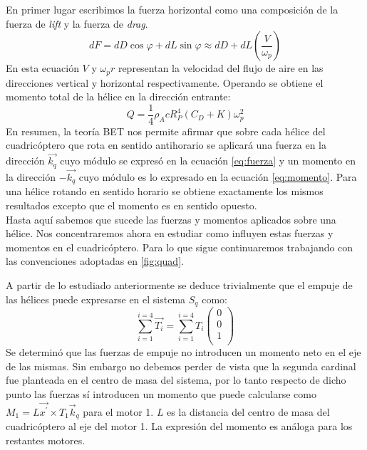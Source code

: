 \documentclass[main]{subfiles}
\begin{document}
En primer lugar escribimos la fuerza horizontal como una composici\'on de la fuerza de \emph{lift} y la fuerza de \emph{drag}. 
\begin{equation}
dF=dD\cos\varphi+dL\sin\varphi \approx dD +dL\left(\frac{V}{\omega_p}\right)
\end{equation} 
En esta ecuaci\'on $V$ y $\omega_p r$ representan la velocidad del flujo de aire en las direcciones vertical y horizontal respectivamente. Operando se obtiene el momento total de la h\'elice en la direcci\'on entrante:
\begin{equation}
\label{eq:momento}
Q=\frac{1}{4}\rho_A c R_P^4(C_D+K)\omega_p^2
\end{equation}
En resumen, la teor\'ia BET nos permite afirmar que sobre cada h\'elice del cuadric\'optero que rota en sentido antihorario se aplicar\'a una fuerza en la direcci\'on $\vec{k_q}$ cuyo m\'odulo se expres\'o en la ecuaci\'on \ref{eq:fuerza} y un momento en la direcci\'on $-\vec{k_q}$ cuyo m\'odulo es lo expresado en la ecuaci\'on \ref{eq:momento}. Para una h\'elice rotando en sentido horario se obtiene exactamente los mismos resultados excepto que el momento es en sentido opuesto.\\

Hasta aqu\'i sabemos que sucede las fuerzas y momentos aplicados sobre una h\'elice. Nos concentraremos ahora en estudiar como influyen estas fuerzas y momentos en el cuadric\'optero. Para lo que sigue continuaremos trabajando con las convenciones adoptadas en \ref{fig:quad}. 
 
A partir de lo estudiado anteriormente se deduce trivialmente que el empuje de las h\'elices puede expresarse en el sistema $S_q$ como:
\begin{equation}
\sum_{i=1}^{i=4} \vec{T_i} =\sum_{i=1}^{i=4}T_i\left(\begin{array}{c}
0\\
0\\
1\\
\end{array} \right)
\end{equation}
Se determin\'o que las fuerzas de empuje no introducen un momento neto en el eje de las mismas. Sin embargo no debemos perder de vista que la segunda cardinal fue planteada en el centro de masa del sistema, por lo tanto respecto de dicho punto las fuerzas s\'i introducen un momento que puede calcularse como $M_1=L\vec{x^\prime} \times T_1\vec{k}_q$ para el motor 1. $L$ es la distancia del centro de masa del cuadric\'optero al eje del motor 1. La expresi\'on del momento es an\'aloga para los restantes motores.
\end{document}
